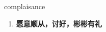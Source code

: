 
\begin{frame}
{\huge complaisance}
\begin{center}
\begin{enumerate}\Large
  \item \textbf{愿意顺从，讨好，彬彬有礼}
\end{enumerate}
\end{center}
\end{frame}
